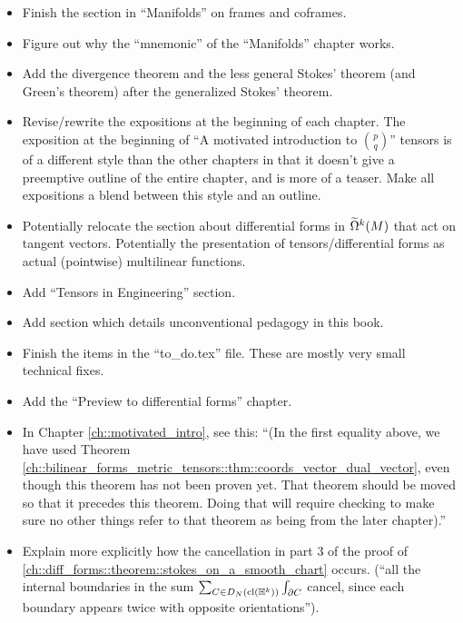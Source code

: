 \begin{itemize}
    \item Finish the section in ``Manifolds'' on frames and coframes.
    \item Figure out why the ``mnemonic'' of the ``Manifolds'' chapter works.
    \item Add the divergence theorem and the less general Stokes' theorem (and Green's theorem) after the generalized Stokes' theorem.
    \item Revise/rewrite the expositions at the beginning of each chapter. The exposition at the beginning of ``A motivated introduction to $\binom{p}{q}$'' tensors is of a different style than the other chapters in that it doesn't give a preemptive outline of the entire chapter, and is more of a teaser. Make all expositions a blend between this style and an outline.
    \item Potentially relocate the section about differential forms in $\widetilde{\Omega}^k(M)$ that act on tangent vectors. Potentially the presentation of  tensors/differential forms as actual (pointwise) multilinear functions.
    \item Add ``Tensors in Engineering'' section.
    \item Add section which details unconventional pedagogy in this book.
    \item Finish the items in the ``to\_do.tex'' file. These are mostly very small technical fixes.
    \item Add the ``Preview to differential forms'' chapter.
    \item In Chapter \ref{ch::motivated_intro}, see this: ``(In the first equality above, we have used Theorem \ref{ch::bilinear_forms_metric_tensors::thm::coords_vector_dual_vector}, even though this theorem has not been proven yet. That theorem should be moved so that it precedes this theorem. Doing that will require checking to make sure no other things refer to that theorem as being from the later chapter).''
    \item Explain more explicitly how the cancellation in part 3 of the proof of \ref{ch::diff_forms::theorem::stokes_on_a_smooth_chart} occurs. (``all the internal boundaries in the sum $\sum_{C \in D_N(\text{cl}(\mathbb{H}^k))} \int_{\partial C}$ cancel, since each boundary appears twice with opposite orientations'').
\end{itemize}